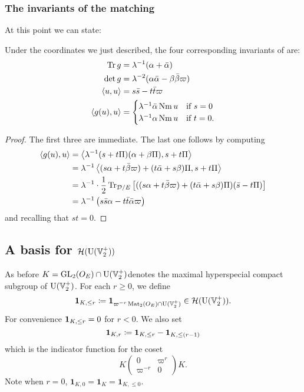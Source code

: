 \subsubsection{The invariants of the matching}
At this point we can state:
\begin{lemma}
  \label{lem:g_u_invariants}
  Under the coordinates we just described,
  the four corresponding invariants of  are:
  \begin{align*}
    \operatorname{Tr} g &= \lambda^{-1} (\alpha + \bar \alpha) \\
    \det g &= \lambda^{-2} (\alpha \bar \alpha - \beta \bar\beta \varpi) \\
    \left\langle u,u \right\rangle &= s \bar s - t \bar t \varpi \\
    \left\langle g(u), u \right\rangle &= \begin{cases}
        \lambda^{-1} \bar\alpha \operatorname{Nm} u & \text{if } s = 0 \\
        \lambda^{-1} \alpha \operatorname{Nm} u & \text{if } t = 0.
      \end{cases}
  \end{align*}
\end{lemma}
\begin{proof}
  The first three are immediate.
  The last one follows by computing
  \begin{align*}
    \left\langle g(u), u \right\rangle
    &= \left\langle \lambda^{-1}(s + t \Pi)(\alpha + \beta \Pi), s + t \Pi \right\rangle \\
    &= \lambda^{-1} \left\langle
      (s \alpha + t \bar \beta \varpi) + (t \bar \alpha + s \beta) \Pi,
      s + t \Pi \right\rangle \\
    &= \lambda^{-1} \cdot \frac{1}{2} \operatorname{Tr}_{\mathcal D/E} \left[
      ((s \alpha + t \bar \beta \varpi) + (t \bar \alpha + s \beta) \Pi)
      (\bar s - t \Pi) \right] \\
    &= \lambda^{-1} \left( s \bar s \alpha - t \bar t \bar \alpha \varpi \right)
  \end{align*}
  and recalling that $s t = 0$.
\end{proof}

\subsection{A basis for $\mathcal H(\operatorname{U}(\mathbb V_2^+))$}
\label{sec:hecke_unitary_basis}

As before $K = \operatorname{GL}_2(O_E) \cap \operatorname{U}(\mathbb V_2^+)$denotes the maximal hyperspecial compact subgroup of $\operatorname{U}(\mathbb V_2^+)$.
For each $r \ge 0$, we define
\[ \mathbf{1}_{K, \le r} \coloneqq \mathbf{1}_{\varpi^{-r} \operatorname{Mat}_2(O_E) \cap \operatorname{U}(\mathbb V_2^+)} \in \mathcal H(\operatorname{U}(\mathbb V_2^+)). \]
For convenience $\mathbf{1}_{K, \le r} = 0$ for $r < 0$.
We also set
\[  \mathbf{1}_{K, r} \coloneqq \mathbf{1}_{K, \le r} - \mathbf{1}_{K, \le (r-1)} \]
which is the indicator function for the coset
\[ K \begin{pmatrix} 0 & \varpi^r \\ \varpi^{-r} & 0 \end{pmatrix} K. \]
Note when $r = 0$, $\mathbf{1}_{K, 0} = \mathbf{1}_K = \mathbf{1}_{K, \le 0}$.

